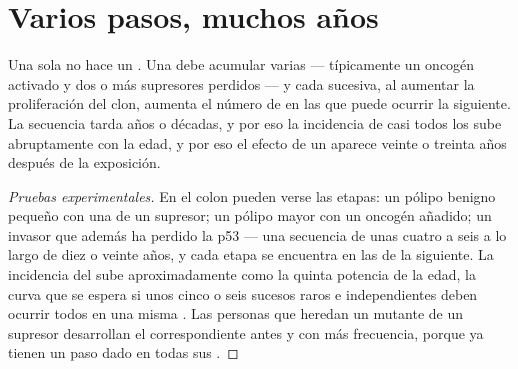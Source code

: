 \section{Varios pasos, muchos años}

\begin{proposition}\label{prop:g11:cancer:multistep}
Una sola  no hace un . Una  debe acumular varias
--- típicamente un oncogén activado y dos o más supresores perdidos ---
y cada  sucesiva, al aumentar la proliferación del clon,
aumenta el número de  en las que puede ocurrir la siguiente. La
secuencia tarda años o décadas, y por eso la incidencia de casi todos
los  sube abruptamente con la edad, y por eso el efecto de un
 aparece veinte o treinta años después de la exposición.
\end{proposition}
\begin{proof}[Pruebas experimentales]
En el colon pueden verse las etapas: un pólipo benigno pequeño con una
 de un supresor; un pólipo mayor con un oncogén añadido; un
 invasor que además ha perdido la p53 --- una secuencia de unas
cuatro a seis  a lo largo de diez o veinte años, y cada etapa
se encuentra en las  de la siguiente. La incidencia del 
sube aproximadamente como la quinta potencia de la edad, la curva que
se espera si unos cinco o seis sucesos raros e independientes deben
ocurrir todos en una misma . Las personas que heredan un 
mutante de un  supresor desarrollan el  correspondiente antes
y con más frecuencia, porque ya tienen un paso dado en todas sus
.
\end{proof}

